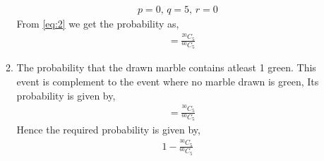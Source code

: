 \documentclass[journal,12pt,twocolumn]{IEEEtran}
\begin{document}
\begin{enumerate}
\begin{enumerate}
\begin{align}
p = 0,\,  q = 5, \, r = 0
\end{align}
From \eqref{eq:2} we get the probability as,
\begin{align}
&= \frac{^{20}C_{5}}{^{60}C_{5}}
\end{align}
\item The probability that the drawn marble contains atleast 1 green. This event is complement to the event where no marble drawn is green, Its probability is given by,
\begin{align}
&= \frac{^{30}C_{5}}{^{60}C_{5}}
\end{align}
Hence the required probability is given by,
\begin{align}
1 - \frac{^{30}C_{5}}{^{60}C_{5}}
\end{align}
\end{enumerate}
\end{enumerate}
\end{document}
